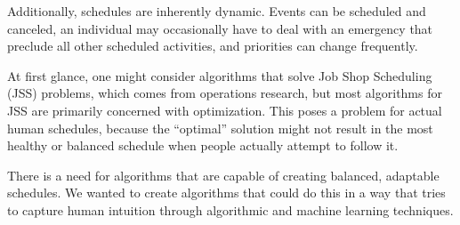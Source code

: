 \documentclass{article}
\newcommand{\todo}[1]{}
\begin{document}
	Additionally, schedules are inherently dynamic.
	Events can be scheduled and canceled, an individual may occasionally have to deal with an emergency that preclude all other scheduled activities, and priorities can change frequently.
	
	At first glance, one might consider algorithms that solve Job Shop Scheduling (JSS) problems, which comes from operations research, but most algorithms for JSS are primarily concerned with optimization. \todo{cite this}
	This poses a problem for actual human schedules, because the ``optimal'' solution might not result in the most healthy or balanced schedule when people actually attempt to follow it.
	
	There is a need for algorithms that are capable of creating balanced, adaptable schedules.
	We wanted to create algorithms that could do this in a way that tries to capture human intuition through algorithmic and machine learning techniques.
	\todo{expand this section}
\end{document}
